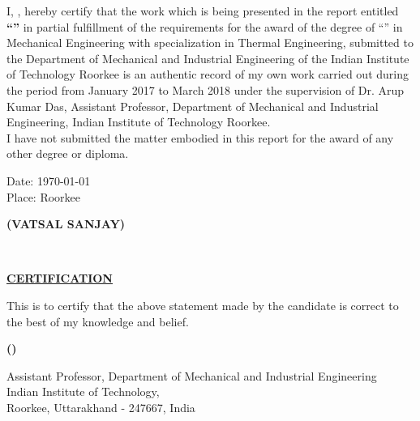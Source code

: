 \begin{declaration}
\addchaptertocentry{\authorshipname}
\noindent I, \authorname, hereby certify that the work which is being presented in the report entitled {\bf\enquote{\ttitle}} in partial fulfillment of the requirements for the award of the degree of \enquote{\degreename} in Mechanical Engineering with specialization in Thermal Engineering, submitted to the Department of Mechanical and Industrial Engineering of the Indian Institute of Technology Roorkee is an  authentic record of my own work carried out during the period from January 2017 to March 2018 under the supervision of Dr. Arup Kumar Das, Assistant Professor, Department of Mechanical and Industrial Engineering, Indian Institute of Technology Roorkee.\\
I have not submitted the matter embodied in this report for the award of any other degree or diploma.\\
\begin{minipage}{0.5\linewidth}\vspace{2.5cm}
\begin{flushleft}
Date: \today\\
Place: Roorkee
\end{flushleft}
\end{minipage}
\begin{minipage}{0.5\linewidth}\vspace{2.5cm}
\begin{flushright}
\textbf{(VATSAL SANJAY)}
\end{flushright} 
\end{minipage}\vspace{10mm}
\HRule\\
\begin{center}
{\large\bfseries\underline{CERTIFICATION}\par}
\end{center}
This is to certify that the above statement made by the candidate is correct to the best of my knowledge and belief.\\
\begin{minipage}{0.56\linewidth}\vspace{2.5cm}
\hfill
\end{minipage}
\begin{minipage}{0.4\linewidth}\vspace{2.5cm}
\begin{center}
\textbf{(\supname)}\\
{Assistant Professor, Department of Mechanical and Industrial Engineering\\Indian Institute of Technology,\\ Roorkee,
Uttarakhand - 247667, India\par}
\end{center}
\end{minipage}
\end{declaration}